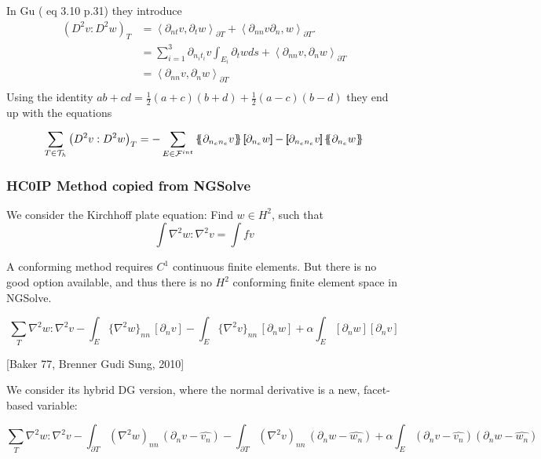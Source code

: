 \begin{enumerate}[label=(\alph*)]
In Gu \cite{gu2012c0} ( eq 3.10 p.31) they introduce \[
            \begin{split}
    \left( D^2v: D^2w \right)_{T } & = \left<\partial _{nt} v , \partial _{t} w  \right>_{\partial T} + \left< \partial
    _{nn} v
    \partial _{n}, w \right>_{\partial T}. \\
    &= \sum_{i=1}^{3} \partial _{n_{i} t_{i}} v \int_{E_{i}}^{} \partial _{t} w ds +\left< \partial
    _{nn} v,
    \partial _{n} w \right>_{\partial T}     \\
    &=\left< \partial
    _{nn} v,
    \partial _{n} w \right>_{\partial T}  \\
            \end{split}
    \]
    Using the identity $ab +cd = \frac{1}{2} (a+c)(b+d) + \frac{1}{2}(a-c)(b-d) $  they end up with the equations  \[
    \sum_{T \in \mathcal{T}_{h}  }^{} \left( D^2v: D^2w \right)_{T }  =
    - \sum_{E \in \mathcal{F} ^{int}}^{}  \mean{ \partial _{n_e n_{e}} v  } \jump{ \partial _{n_{e}} w } - \jump{
    \partial _{n_e n_{e}} v}  \mean{ \partial _{n_{e}} w }
    \]
\end{enumerate}


\subsubsection{HC0IP Method copied from NGSolve}%
\label{ssub:hc0ip_method_from_ngsolve}


We consider the Kirchhoff plate equation: Find $w \in H^2$, such that
$$
\int \nabla^2 w : \nabla^2 v = \int f v
$$

A conforming method requires $C^1$ continuous finite elements. But there is no good option available, and thus there is no $H^2$ conforming finite element space in NGSolve.

$$
\sum_T \nabla^2 w : \nabla^2 v
- \int_{E} \{\nabla^2 w\}_{nn} \, [\partial_n v]
- \int_{E} \{\nabla^2 v\}_{nn} \, [\partial_n w] + \alpha \int_E  [\partial_n w]  [\partial_n v]
$$

[Baker 77, Brenner Gudi Sung, 2010]

We consider its hybrid DG version, where the normal derivative is a new, facet-based variable:

$$
\sum_T \nabla^2 w : \nabla^2 v
- \int_{\partial T} (\nabla^2 w)_{nn} \, (\partial_n v - \widehat{v_n})
- \int_{\partial T} (\nabla^2 v)_{nn} \, (\partial_n w - \widehat{w_n}) + \alpha \int_E (\partial_n v - \widehat{v_n}) (\partial_n w - \widehat{w_n})
$$










